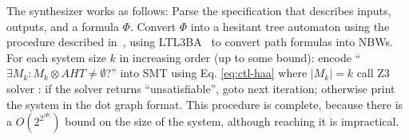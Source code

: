 The synthesizer works as follows:
\li
\-[(1)] Parse the specification that describes inputs, outputs,
       and a \CTLstar formula $\Phi$.
\-[(2)] Convert $\Phi$ into a hesitant tree automaton using the procedure
       described in~\cite{ATA},
       using LTL3BA~\cite{LTL3BA} to convert path formulas into NBWs.
\-[(3)] For each system size $k$ in increasing order (up to some bound):
       \li
       \- encode ``$\exists M_k: M_k\otimes AHT \neq \emptyset$?''
          into SMT using Eq. \ref{eq:ctl-haa} where $|M_k|=k$
       \- call Z3 solver \cite{Moura08}:
       if the solver returns ``unsatisfiable'',
          goto next iteration;
       otherwise
          print the system in the dot graph format.
       \il
\il
This procedure is complete,
because there is a $O(2^{2^{|\Phi|}})$ bound on the size of the system,
although reaching it is impractical.

